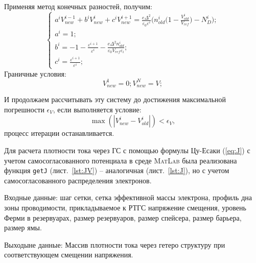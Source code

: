 Применяя метод конечных разностей, получим:
\begin{equation}
	\label{eq:VsFD}
	\begin{cases}
		a^{i}V_{new}^{i-1} + b^{i}V_{new}^{i} + c^{i}V^{i+1}_{new} = \frac{e\Delta^{2}}{\varepsilon_{0}\varepsilon^{i}}\bigg( n_{old}^{i}\bigg( 1 - \frac{V_{old}^{i}}{V_{ref}} \bigg) - N_{D}^{i} \bigg);\\
		a^{i} = 1;\\
		b^{i} = -1 - \frac{\varepsilon^{i+1}}{\varepsilon^{i}} -\frac{e\Delta^{2}n_{old}^{i}}{\varepsilon_{0} V_{ref}\varepsilon_{i}};\\
		c^{i} = \frac{\varepsilon^{i+1}}{\varepsilon^{i}};
	\end{cases}
\end{equation}
Граничные условия:
\begin{equation}
	\label{eq:VsFDB}
	V^{1}_{new} = 0;
	V^{N}_{new} = V;
\end{equation}

И продолжаем рассчитывать эту систему до достижения максимальной погрешности $\epsilon_{V}$, если выполняется условие:
\begin{equation}
	\label{eq:IterLim}
 	\max(|V_{new}^{i} - V_{old}^{i}|) < \epsilon_{V},
\end{equation} 
процесс итерации останавливается.

Для расчета плотности тока через ГС с помощью формулы Цу-Есаки (\ref{eq:J}) с учетом самосогласованного потенциала в среде \textsc{MatLab} была реализована функция \texttt{getJ} (лист.~\ref{lst:JV}) -- аналогичная (лист.~\ref{lst:J}), но с учетом самосогласованного распределения электронов.

Входные данные: шаг сетки, сетка эффективной массы электрона, профиль дна зоны проводимости, прикладываемое к РТГС напряжение смещения, уровень Ферми в резервуарах, размер резервуаров, размер спейсера, размер барьера, размер ямы.

Выходыне данные: Массив плотности тока через гетеро структуру при соответствующем смещении напряжения.

